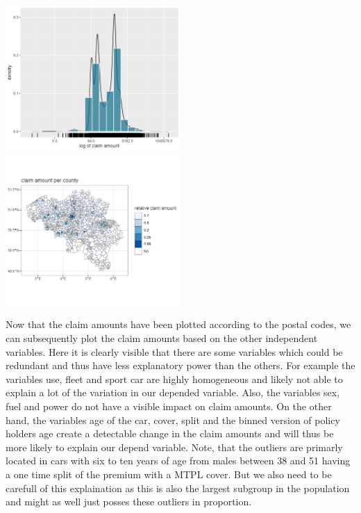 \documentclass[
  12pt,
]{article}
\begin{document}
\includegraphics[width=0.5\textwidth,height=\textheight]{Severity_Analysis/plots/exploratory/density.png}
\includegraphics[width=0.5\textwidth,height=\textheight]{Severity_Analysis/plots/exploratory/county.png}

Now that the claim amounts have been plotted according to the postal
codes, we can subsequently plot the claim amounts based on the other
independent variables. Here it is clearly visible that there are some
variables which could be redundant and thus have less explanatory power
than the others. For example the variables use, fleet and sport car are
highly homogeneous and likely not able to explain a lot of the variation
in our depended variable. Also, the variables sex, fuel and power do not
have a visible impact on claim amounts. On the other hand, the variables
age of the car, cover, split and the binned version of policy holders
age create a detectable change in the claim amounts and will thus be
more likely to explain our depend variable. Note, that the outliers are
primarly located in cars with six to ten years of age from males between
38 and 51 having a one time split of the premium with a MTPL cover. But
we also need to be carefull of this explaination as this is also the
largest subgroup in the population and might as well just posses these
outliers in proportion.
\end{document}

